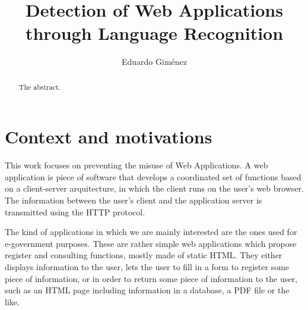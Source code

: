 \documentclass[runningheads,a4paper]{llncs}
\begin{document}


\title{Detection of Web Applications through Language Recognition}

\author{Eduardo Giménez}

%
\iffalse
\author{Firstname Lastname\inst{1} \and Firstname Lastname\inst{2} }

\institute{
Insitute 1\\
\email{...}\and
Insitute 2\\
\email{...}
}
\fi
			
\maketitle

\begin{abstract}
The abstract.
\end{abstract}


\section{Context and motivations}\label{sec:intro}

This work focuses on preventing the misuse of Web Applications. A web application is piece of software that develops a coordinated set of functions based on a client-server arquitecture, in which the client runs on the user’s web browser. The information between the user’s client and the application server is transmitted using the HTTP protocol.

The kind of applications in which we are mainly interested are the ones used for e-government purposes. These are rather simple web applications which propose register and consulting functions, mostly made of static HTML. They either displays information to the user, lets the user to fill in a form to register some piece of information, or in order to return some piece of information to the user, such as an HTML page including information in a database, a PDF file or the like. 
\end{document}
